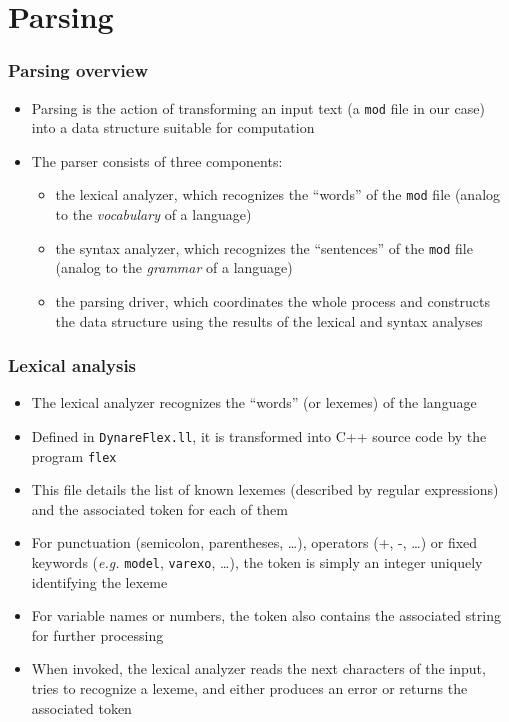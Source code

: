 \documentclass{beamer}
\begin{document}
\section{Parsing}

\begin{frame}
\frametitle{Parsing overview}
\begin{itemize}
\item Parsing is the action of transforming an input text (a \texttt{mod} file in our case) into a data structure suitable for computation
\item The parser consists of three components:
  \begin{itemize}
  \item the \alert{lexical analyzer}, which recognizes the ``words'' of the \texttt{mod} file (analog to the \textit{vocabulary} of a language)
  \item the \alert{syntax analyzer}, which recognizes the ``sentences'' of the \texttt{mod} file (analog to the \textit{grammar} of a language)
  \item the \alert{parsing driver}, which coordinates the whole process and constructs the data structure using the results of the lexical and syntax analyses
  \end{itemize}
\end{itemize}
\end{frame}

\begin{frame}
\frametitle{Lexical analysis}
\begin{itemize}
\item The lexical analyzer recognizes the ``words'' (or \alert{lexemes}) of the language
\item Defined in \texttt{DynareFlex.ll}, it is transformed into C++ source code by the program \texttt{flex}
\item This file details the list of known lexemes (described by regular expressions) and the associated \alert{token} for each of them
\item For punctuation (semicolon, parentheses, \ldots), operators (+, -, \ldots) or fixed keywords (\textit{e.g.} \texttt{model}, \texttt{varexo}, \ldots), the token is simply an integer uniquely identifying the lexeme
\item For variable names or numbers, the token also contains the associated string for further processing
\item When invoked, the lexical analyzer reads the next characters of the input, tries to recognize a lexeme, and either produces an error or returns the associated token
\end{itemize}
\end{frame}
\end{document}
